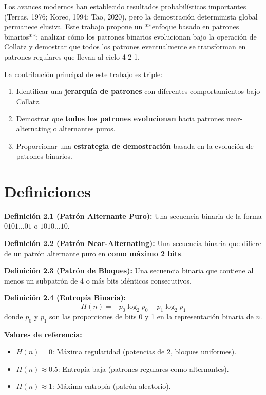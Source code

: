\documentclass[11pt,a4paper]{article}
\begin{document}
Los avances modernos han establecido resultados probabilísticos importantes (Terras, 1976; Korec, 1994; Tao, 2020), pero la demostración determinista global permanece elusiva. Este trabajo propone un **enfoque basado en patrones binarios**: analizar cómo los patrones binarios evolucionan bajo la operación de Collatz y demostrar que todos los patrones eventualmente se transforman en patrones regulares que llevan al ciclo 4-2-1.

La contribución principal de este trabajo es triple:
\begin{enumerate}
    \item Identificar una \textbf{jerarquía de patrones} con diferentes comportamientos bajo Collatz.
    \item Demostrar que \textbf{todos los patrones evolucionan} hacia patrones near-alternating o alternantes puros.
    \item Proporcionar una \textbf{estrategia de demostración} basada en la evolución de patrones binarios.
\end{enumerate}

\section{Definiciones}

\textbf{Definición 2.1 (Patrón Alternante Puro):}
Una secuencia binaria de la forma \( 0101\dots01 \) o \( 1010\dots10 \).

\textbf{Definición 2.2 (Patrón Near-Alternating):}
Una secuencia binaria que difiere de un patrón alternante puro en \textbf{como máximo 2 bits}.

\textbf{Definición 2.3 (Patrón de Bloques):}
Una secuencia binaria que contiene al menos un subpatrón de 4 o más bits idénticos consecutivos.

\textbf{Definición 2.4 (Entropía Binaria):}
\[
H(n) = -p_0 \log_2 p_0 - p_1 \log_2 p_1
\]
donde \( p_0 \) y \( p_1 \) son las proporciones de bits 0 y 1 en la representación binaria de \( n \).

\textbf{Valores de referencia:}
\begin{itemize}
    \item \( H(n) = 0 \): Máxima regularidad (potencias de 2, bloques uniformes).
    \item \( H(n) \approx 0.5 \): Entropía baja (patrones regulares como alternantes).
    \item \( H(n) \approx 1 \): Máxima entropía (patrón aleatorio).
\end{itemize}
\end{document}
